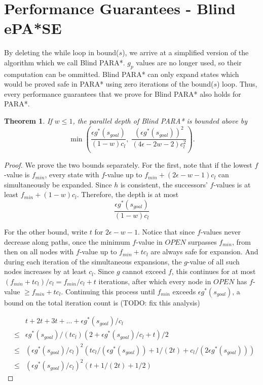 \documentclass[letterpaper]{article}
\newtheorem{thm}{Theorem}
\begin{document}
\section{Performance Guarantees - Blind ePA*SE}

By deleting the while loop in bound($s$), we arrive at a simplified version of the algorithm which we call Blind PARA*. $g_p$ values are no longer used, so their computation can be ommitted. Blind PARA* can only expand states which would be proved safe in PARA* using zero iterations of the bound($s$) loop. Thus, every performance guarantees that we prove for Blind PARA* also holds for PARA*. 

\begin{thm}
\label{thm:depth}
If $w \le 1$, the parallel depth of Blind PARA* is bounded above by
\[\min\left(\frac{\epsilon g^*(s_{goal})}{(1-w)c_l},\;
\frac{\left(\epsilon g^*(s_{goal})\right)^2 }{(4\epsilon-2w-2)c_l^2}\right).\]
\end{thm}

\begin{proof}
We prove the two bounds separately. For the first, note that if the lowest $f$-value is $f_{min}$, every state with $f$-value up to $f_{min} + (2\epsilon-w-1)c_l$ can simultaneously be expanded. Since $h$ is consistent, the successors' $f$-values is at least $f_{min} + (1-w)c_l$. Therefore, the depth is at most
\[\frac{\epsilon g^*(s_{goal})}{(1-w)c_l}\]

For the other bound, write $t$ for $2\epsilon-w-1$. Notice that since $f$-values never decrease along paths, once the minimum $f$-value in $OPEN$ surpasses $f_{min}$, from then on all nodes with $f$-value up to $f_{min} + tc_l$ are always safe for expansion. And during each iteration of the simultaneous expansions, the $g$-value of all such nodes increases by at least $c_l$. Since $g$ cannot exceed $f$, this continues for at most $(f_{min} + tc_l) / c_l = f_{min}/c_l + t$ iterations, after which every node in $OPEN$ has $f$-value $\ge f_{min} + tc_l$. Continuing this process until $f_{min}$ exceeds $\epsilon g^*(s_{goal})$, a bound on the total iteration count is (TODO: fix this analysis)

\begin{eqnarray*}
&&t + 2t + 3t + ... + \epsilon g^*(s_{goal})/c_l
\\&\le& \epsilon  g^*(s_{goal})/(tc_l)(2+\epsilon g^*(s_{goal})/c_l+t)/2
\\&\le& (\epsilon g^*(s_{goal})/c_l )^2 (tc_l/(\epsilon g^*(s_{goal})) + 1/(2t) + c_l/(2\epsilon g^*(s_{goal})))
\\&\le& (\epsilon g^*(s_{goal})/c_l )^2 (t + 1/(2t) + 1/2)
\end{eqnarray*}
\end{proof}
\end{document}

